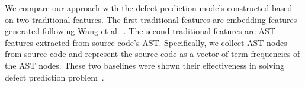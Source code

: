 
We compare our approach with the defect prediction models constructed based on two traditional features. The first traditional features are embedding features generated following Wang et al.~\cite{wang2016automatically}. The second traditional features are AST features extracted from source code's AST. Specifically, we collect AST nodes from source code and represent the source code as a vector of term frequencies of the AST nodes. These two baselines were shown their effectiveness in solving defect prediction problem~\cite{wang2016automatically}.



